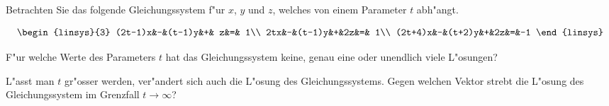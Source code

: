Betrachten Sie das folgende Gleichungssystem f"ur $x$, $y$ und $z$, 
welches von einem Parameter $t$ abh"angt.

\[
\begin{linsys}{3}
(2t-1)x&-&(t-1)y&+& z&=& 1\\
    2tx&-&(t-1)y&+&2z&=& 1\\
(2t+4)x&-&(t+2)y&+&2z&=&-1
\end{linsys}
\]
\begin{teilaufgaben}
\item
F"ur welche Werte des Parameters $t$ hat das Gleichungssystem
keine, genau eine oder unendlich viele L"osungen?
\item
L"asst man $t$ gr"osser werden, ver"andert sich auch die L"osung
des Gleichungssystems. Gegen welchen Vektor strebt die L"osung
des Gleichungssystem im Grenzfall $t\to\infty$?
\end{teilaufgaben}

